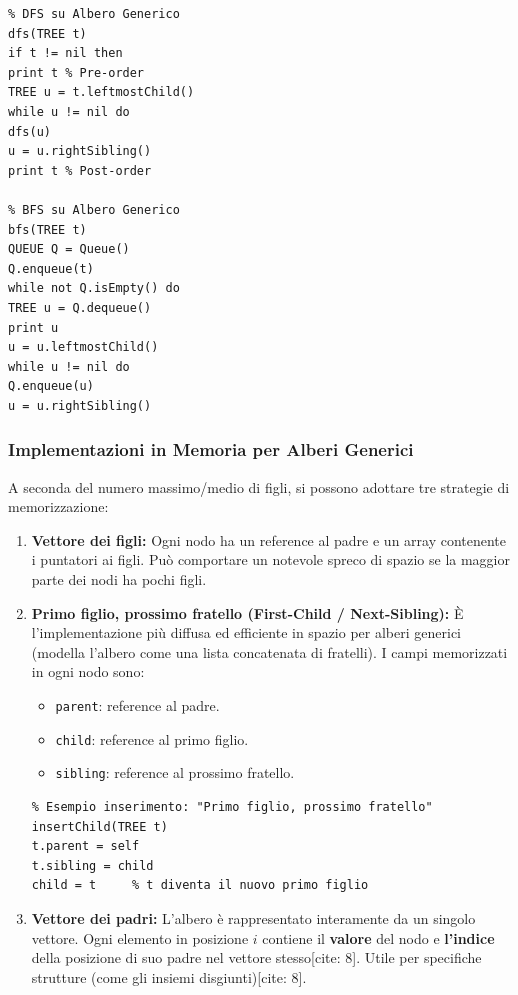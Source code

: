 \documentclass[12pt, a4paper]{article}
\begin{document}
\begin{verbatim}
% DFS su Albero Generico
dfs(TREE t)
if t != nil then
print t % Pre-order
TREE u = t.leftmostChild()
while u != nil do
dfs(u)
u = u.rightSibling()
print t % Post-order

% BFS su Albero Generico
bfs(TREE t)
QUEUE Q = Queue()
Q.enqueue(t)
while not Q.isEmpty() do
TREE u = Q.dequeue()
print u
u = u.leftmostChild()
while u != nil do
Q.enqueue(u)
u = u.rightSibling()
\end{verbatim}

\subsubsection{Implementazioni in Memoria per Alberi Generici}
A seconda del numero massimo/medio di figli, si possono adottare tre strategie di memorizzazione:

\begin{enumerate}
\item \textbf{Vettore dei figli:} Ogni nodo ha un reference al padre e un array contenente i puntatori ai figli. Può comportare un notevole spreco di spazio se la maggior parte dei nodi ha pochi figli.
\item \textbf{Primo figlio, prossimo fratello (First-Child / Next-Sibling):}
È l'implementazione più diffusa ed efficiente in spazio per alberi generici (modella l'albero come una lista concatenata di fratelli).
I campi memorizzati in ogni nodo sono:
\begin{itemize}
\item \texttt{parent}: reference al padre.
\item \texttt{child}: reference al primo figlio.
\item \texttt{sibling}: reference al prossimo fratello.
\end{itemize}
\begin{verbatim}
% Esempio inserimento: "Primo figlio, prossimo fratello"
insertChild(TREE t)
t.parent = self
t.sibling = child
child = t     % t diventa il nuovo primo figlio
\end{verbatim}


\item \textbf{Vettore dei padri:}
L'albero è rappresentato interamente da un singolo vettore. Ogni elemento in posizione $i$ contiene il \textbf{valore} del nodo e \textbf{l'indice} della posizione di suo padre nel vettore stesso[cite: 8]. Utile per specifiche strutture (come gli insiemi disgiunti)[cite: 8].


\end{enumerate}
\end{document}
